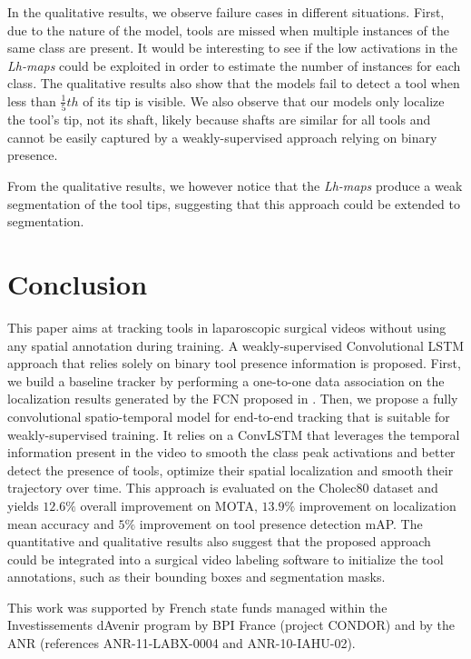 \documentclass{svjour3}                     \smartqed
\begin{document}
In the qualitative results, we observe failure cases in different situations. First, due to the nature of the model, tools are missed when multiple instances of the same class are present. It would be interesting to see if the low activations in the \emph{Lh-maps} could be exploited in order to estimate the number of instances for each class.
The qualitative results also show that the models fail to detect a tool when less than $\frac{1}{5}th$ of its tip is visible. 
We also observe that our models only localize the tool's tip, not its shaft, likely because shafts are similar for all tools and cannot be easily captured by a weakly-supervised approach relying on binary presence.

From the qualitative results, we however notice that the \emph{Lh-maps} produce a weak segmentation of the tool tips, suggesting that this approach could be extended to segmentation.



\section{Conclusion}\label{sec:conclusion}
This paper aims at tracking tools in laparoscopic surgical videos without using any spatial annotation during training. 
A weakly-supervised Convolutional LSTM approach that relies solely on binary tool presence information is proposed. 
First, we build a baseline tracker by performing a one-to-one data association on the localization results generated by the FCN proposed in \cite{miccai:vardazaryan2018weakly}.
Then, we propose a fully convolutional spatio-temporal model for end-to-end tracking that is suitable for weakly-supervised training. It relies on a ConvLSTM that leverages the temporal information present in the video to smooth the class peak activations and better detect the presence of tools, optimize their spatial localization and smooth their trajectory over time. 
This approach is evaluated on the Cholec80 dataset and yields $12.6\%$ overall improvement on MOTA, $13.9\%$ improvement on localization mean accuracy and $5\%$ improvement on tool presence detection mAP.
The quantitative and qualitative results also suggest that the proposed approach could be integrated into a surgical video labeling software to initialize the tool annotations, such as their bounding boxes and segmentation masks.



\begin{acknowledgements}
This work was supported by French state funds managed
within the Investissements d\textsc{}Avenir program by BPI France (project CONDOR) and by the ANR (references ANR-11-LABX-0004 and ANR-10-IAHU-02). 
\end{acknowledgements}
\end{document}
